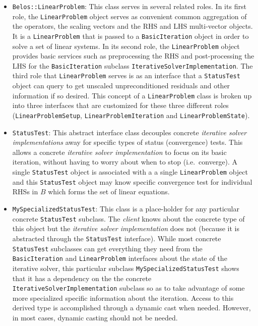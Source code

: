 \documentclass[pdf,ps2pdf,11pt]{SANDreport}
\begin{document}
\begin{itemize}
\item{}\texttt{Belos::LinearProblem}:
This class serves in several related roles.  In its first role, the
{}\texttt{Linear\-Problem} object serves as convenient common
aggregation of the operators, the scaling vectors and the RHS and LHS
multi-vector objects.  It is a {}\texttt{Linear\-Problem} that is
passed to a {}\texttt{Basic\-Iteration} object in order to solve a set
of linear systems.  In its second role, the {}\texttt{Linear\-Problem}
object provides basic services such as preprocessing the RHS and
post-processing the LHS for the {}\texttt{Basic\-Iteration} subclass
{}\texttt{Iterative\-Solver\-Implementation}.  The third role that
{}\texttt{Linear\-Problem} serves is as an interface that a
{}\texttt{Status\-Test} object can query to get unscaled
unpreconditioned residuals and other information if so desired.  This
concept of a {}\texttt{Linear\-Problem} class is broken up into three
interfaces that are customized for these three different roles
({}\texttt{Linear\-Problem\-Setup},
{}\texttt{Linear\-Problem\-Iteration} and
{}\texttt{Linear\-Problem\-State}).

\item{}\texttt{StatusTest}:
This abstract interface class decouples concrete {}\textit{iterative
solver implementations} away for specific types of status
(convergence) tests.  This allows a concrete {}\textit{iterative
solver implementation} to focus on its basic iteration, without having
to worry about when to stop (i.e.~converge).  A single
{}\texttt{Status\-Test} object is associated with a a single
{}\texttt{Linear\-Problem} object and this {}\texttt{Status\-Test}
object may know specific convergence test for individual RHSs in $B$
which forms the set of linear equations.

\item{}\texttt{MySpecializedStatusTest}:
This class is a place-holder for any particular concrete
{}\texttt{Status\-Test} subclass.  The {}\textit{client} knows about
the concrete type of this object but the {}\textit{iterative solver
implementation} does not (because it is abstracted through the
{}\texttt{StatusTest} interface).  While most concrete
{}\texttt{StatusTest} subclasses can get everything they need from the
{}\texttt{Basic\-Iteration} and {}\texttt{Linear\-Problem} interfaces
about the state of the iterative solver, this particular subclass
{}\texttt{My\-Specialized\-Status\-Test} shows that it has a
dependency on the the concrete
{}\texttt{Iterative\-Solver\-Implementation} subclass so as to take
advantage of some more specialized specific information about the
iteration.  Access to this derived type is accomplished through a
dynamic cast when needed.  However, in most cases, dynamic casting
should not be needed.

\end{itemize}
\end{document}

